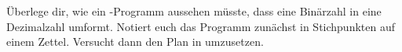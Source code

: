 \documentclass[10pt, a4paper]{arbeitsblatt}
\begin{document}
\begin{aufgabe}[icon=\iconStern\,\iconLaptop\,\iconPartner]
	Überlege dir, wie ein -Programm
	aussehen müsste, dass eine Binärzahl in eine Dezimalzahl umformt. Notiert euch
	das Programm zunächst in Stichpunkten auf einem Zettel. Versucht dann den Plan
	in  umzusetzen.
\end{aufgabe}
\end{document}
